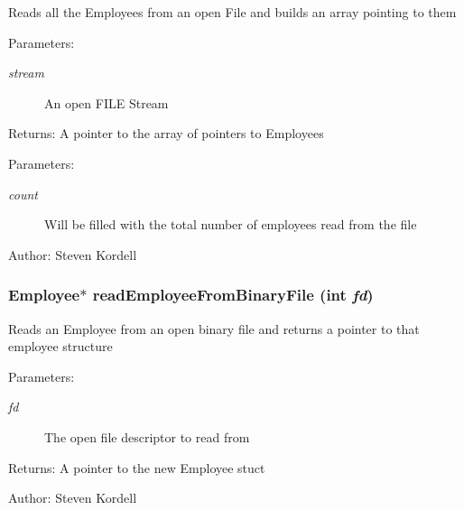 Reads all the Employees from an open File and builds an array pointing to them \begin{Desc}
\item[Parameters:]
\begin{description}
\item[{\em stream}]An open FILE Stream \end{description}
\end{Desc}
\begin{Desc}
\item[Returns:]A pointer to the array of pointers to Employees \end{Desc}
\begin{Desc}
\item[Parameters:]
\begin{description}
\item[{\em count}]Will be filled with the total number of employees read from the file \end{description}
\end{Desc}
\begin{Desc}
\item[Author:]Steven Kordell \end{Desc}
\subsubsection{\setlength{\rightskip}{0pt plus 5cm}\bf{Employee}$\ast$ read\-Employee\-From\-Binary\-File (int {\em fd})}\label{employeef_8c_9b60b71d275839e4b93dd6a1827b9e31}


Reads an Employee from an open binary file and returns a pointer to that employee structure \begin{Desc}
\item[Parameters:]
\begin{description}
\item[{\em fd}]The open file descriptor to read from \end{description}
\end{Desc}
\begin{Desc}
\item[Returns:]A pointer to the new Employee stuct \end{Desc}
\begin{Desc}
\item[Author:]Steven Kordell \end{Desc}
